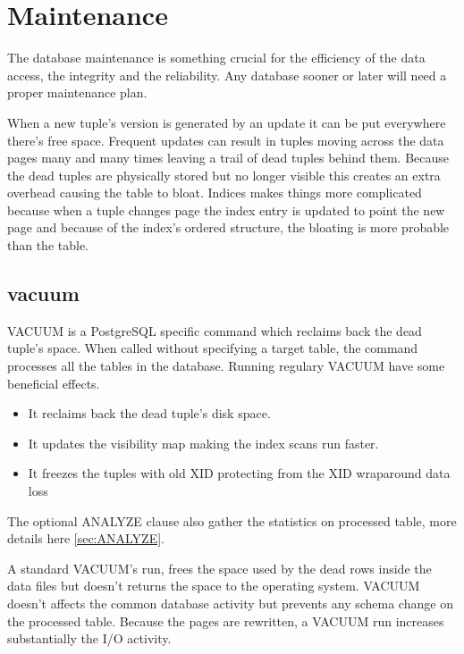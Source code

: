 \chapter{Maintenance}
\label{cha:MAINTENANCE}
The database maintenance is something crucial for the efficiency of the data access, the integrity 
and the reliability. Any database sooner or later will need a proper maintenance plan. \newline

When a new tuple's version is generated by an update it can be put everywhere there's free space. 
Frequent updates can result in tuples moving across the data pages many and many times leaving a 
trail of dead tuples behind them. Because the dead tuples are physically stored but no 
longer visible this creates an extra overhead causing the table to bloat.
Indices makes things more complicated because when a tuple changes page the index entry is updated 
to point the new page and because of the index's ordered structure, the bloating is more 
probable than the table. 


\section{vacuum}
\label{sec:VACUUM}
VACUUM is a PostgreSQL specific command which reclaims back the dead tuple's space. When called 
without specifying a target table, the command processes all the tables in the database. Running 
regulary VACUUM have some beneficial effects.

\begin{itemize}
 \item It reclaims back the dead tuple's disk space.
 \item It updates the visibility map making the index scans run faster.
 \item It freezes the tuples with old XID protecting from the XID wraparound 
data loss
\end{itemize}

The optional ANALYZE clause also gather the statistics on processed table, more details here 
\ref{sec:ANALYZE}.\newline

A standard VACUUM's run, frees the space used by the dead rows inside the data files but doesn't 
returns the space to the operating system. VACUUM doesn't affects the common database activity 
but prevents any schema change on the processed table. Because the pages are rewritten, a VACUUM 
run increases substantially the I/O activity. \newline

